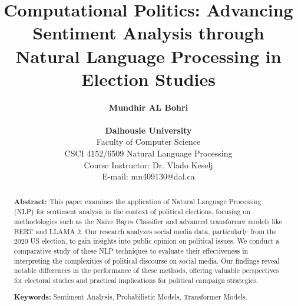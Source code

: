 \documentclass[10pt]{article}
\title{
    \vspace{0mm} \textbf{Computational Politics: Advancing Sentiment Analysis through Natural Language Processing in Election Studies}\vspace{4mm}
}
\author{
    \fontsize{10}{12}\selectfont \textbf{Mundhir AL Bohri}\\ \\
    \small{\textbf{\fontsize{10}{12}\selectfont Dalhousie University}}\\
    \small{\fontsize{10}{12}\selectfont Faculty of Computer Science}\\
    \small{\fontsize{10}{12}\selectfont CSCI 4152/6509 Natural Language Processing}\\
    \small{\fontsize{10}{12}\selectfont Course Instructor: Dr. Vlado Keselj}\\
    \small{\fontsize{10}{12}\selectfont E-mail: mn409130@dal.ca}
}
\date{\vspace{-6mm}}
\begin{document}
\fontsize{10}{12}\selectfont


\def\tablename{Tabla}%

\setlength{\parskip}{0mm}

\maketitle

\setlength{\parskip}{3mm}


\renewcommand\abstractname{}

\begin{abstract}
    \fontsize{10}{12}\selectfont
    \textbf{Abstract:} This paper examines the application of Natural Language Processing (NLP) for sentiment analysis in the context of political elections, focusing on methodologies such as the Naive Bayes Classifier and advanced transformer models like BERT and LLAMA 2. Our research analyzes social media data, particularly from the 2020 US election, to gain insights into public opinion on political issues. We conduct a comparative study of these NLP techniques to evaluate their effectiveness in interpreting the complexities of political discourse on social media. Our findings reveal notable differences in the performance of these methods, offering valuable perspectives for electoral studies and practical implications for political campaign strategies.

    \vspace{3mm}
    
    \textbf{Keywords:} Sentiment Analysis, Probabilistic Models, Transformer Models.
    \vspace{-7mm}
\end{abstract}

\vspace{8mm}

\setlength{\columnsep}{1cm}

\renewcommand{\tablename}{Tabla}
\end{document}
